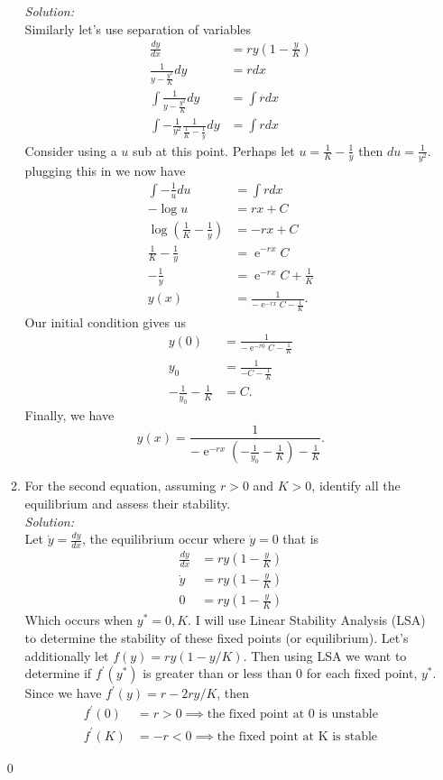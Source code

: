 \documentclass[10pt]{amsart}
\DeclareMathOperator{\E}{e}
\theoremstyle{nonumberplain}
\begin{document}
\begin{enumerate}[label={\bf {Question \arabic*}}]
\begin{enumerate}
\textit{Solution:} \\
Similarly let's use separation of variables
\begin{align*}
\frac{dy}{dx} &= ry\left(1 - \frac y K\right) \\
\frac 1 {y - \frac{y^2} K}dy &= rdx \\
\int \frac 1 {y - \frac{y^2} K}dy &= \int rdx \\
\int - \frac 1 {y^2} \frac 1 {\frac 1 K - \frac 1 y}dy &= \int rdx
\end{align*}
Consider using a $u$ sub at this point.
Perhaps let $u = \frac 1 K - \frac 1 y$ then $du = \frac 1 {y^2}$.
plugging this in we now have
\begin{align*}
\int - \frac 1 {u}du &= \int rdx \\
- \log u &= rx + C \\
\log \left( \frac 1 K - \frac 1 y \right) &= - rx + C \\
\frac 1 K - \frac 1 y &= \E^{- rx}C \\
- \frac 1 y &= \E^{- rx}C + \frac 1K \\
y(x) &= \frac 1 {- \E^{- rx}C - \frac 1K}.
\end{align*}
Our initial condition gives us
\begin{align*}
y(0) &= \frac 1 {- \E^{- r0}C - \frac 1K} \\
y_0 &= \frac 1 {-C - \frac 1K} \\
- \frac 1 {y_0} - \frac 1 K &= C.
\end{align*}
Finally, we have
$$
y(x) = \frac 1 {- \E^{- rx}\left( - \frac 1 {y_0} - \frac 1 K \right) - \frac 1K}.
$$

\item For the second equation, assuming $r > 0$ and $K > 0$, identify all the equilibrium and assess their stability. \\

\textit{Solution:} \\
Let $\dot y = \frac {dy}{dx}$, the equilibrium occur where $\dot y = 0$ that is
\begin{align*}
\frac {dy}{dx} &= ry\left(1 - \frac y K\right) \\
\dot y &= ry\left(1 - \frac y K\right) \\
0 &= ry\left(1 - \frac y K\right)
\end{align*}
Which occurs when $y^* = 0, K$.
I will use Linear Stability Analysis (LSA) to determine the stability of these fixed points (or equilibrium).
Let's additionally let $f(y) = ry\left(1 - y/K\right)$.
Then using LSA we want to determine if $f^\prime(y^*)$ is greater than or less than 0 for each fixed point, $y^*$.
Since we have $f^\prime(y) = r - 2ry/K$, then
\begin{align*}
f^\prime(0) &= r > 0 \implies \text{the fixed point at 0 is unstable} \\
f^\prime(K) &= -r < 0 \implies \text{the fixed point at K is stable}
\end{align*}
\end{enumerate}
\qed \\
\newpage


\end{enumerate}
\end{document}
